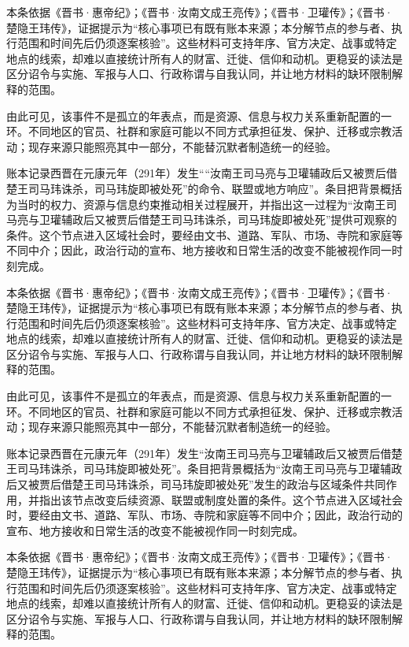 本条依据《晋书·惠帝纪》；《晋书·汝南文成王亮传》；《晋书·卫瓘传》；《晋书·楚隐王玮传》，证据提示为“核心事项已有既有账本来源；本分解节点的参与者、执行范围和时间先后仍须逐案核验”。这些材料可支持年序、官方决定、战事或特定地点的线索，却难以直接统计所有人的财富、迁徙、信仰和动机。更稳妥的读法是区分诏令与实施、军报与人口、行政称谓与自我认同，并让地方材料的缺环限制解释的范围。

由此可见，该事件不是孤立的年表点，而是资源、信息与权力关系重新配置的一环。不同地区的官员、社群和家庭可能以不同方式承担征发、保护、迁移或宗教活动；现存来源只能照亮其中一部分，不能替沉默者制造统一的经验。

账本记录西晋在元康元年（291年）发生““汝南王司马亮与卫瓘辅政后又被贾后借楚王司马玮诛杀，司马玮旋即被处死”的命令、联盟或地方响应”。条目把背景概括为当时的权力、资源与信息约束推动相关过程展开，并指出这一过程为“汝南王司马亮与卫瓘辅政后又被贾后借楚王司马玮诛杀，司马玮旋即被处死”提供可观察的条件。这个节点进入区域社会时，要经由文书、道路、军队、市场、寺院和家庭等不同中介；因此，政治行动的宣布、地方接收和日常生活的改变不能被视作同一时刻完成。

本条依据《晋书·惠帝纪》；《晋书·汝南文成王亮传》；《晋书·卫瓘传》；《晋书·楚隐王玮传》，证据提示为“核心事项已有既有账本来源；本分解节点的参与者、执行范围和时间先后仍须逐案核验”。这些材料可支持年序、官方决定、战事或特定地点的线索，却难以直接统计所有人的财富、迁徙、信仰和动机。更稳妥的读法是区分诏令与实施、军报与人口、行政称谓与自我认同，并让地方材料的缺环限制解释的范围。

由此可见，该事件不是孤立的年表点，而是资源、信息与权力关系重新配置的一环。不同地区的官员、社群和家庭可能以不同方式承担征发、保护、迁移或宗教活动；现存来源只能照亮其中一部分，不能替沉默者制造统一的经验。

账本记录西晋在元康元年（291年）发生“汝南王司马亮与卫瓘辅政后又被贾后借楚王司马玮诛杀，司马玮旋即被处死”。条目把背景概括为“汝南王司马亮与卫瓘辅政后又被贾后借楚王司马玮诛杀，司马玮旋即被处死”发生的政治与区域条件共同作用，并指出该节点改变后续资源、联盟或制度处置的条件。这个节点进入区域社会时，要经由文书、道路、军队、市场、寺院和家庭等不同中介；因此，政治行动的宣布、地方接收和日常生活的改变不能被视作同一时刻完成。

本条依据《晋书·惠帝纪》；《晋书·汝南文成王亮传》；《晋书·卫瓘传》；《晋书·楚隐王玮传》，证据提示为“核心事项已有既有账本来源；本分解节点的参与者、执行范围和时间先后仍须逐案核验”。这些材料可支持年序、官方决定、战事或特定地点的线索，却难以直接统计所有人的财富、迁徙、信仰和动机。更稳妥的读法是区分诏令与实施、军报与人口、行政称谓与自我认同，并让地方材料的缺环限制解释的范围。

